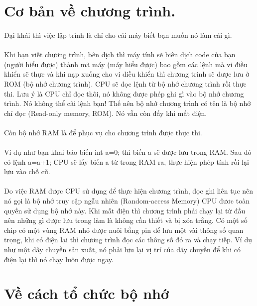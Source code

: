 \documentclass[12pt,a5paper]{book}
\begin{document}
	\section{Cơ bản về chương trình.}
	\paragraph{} 
Đại khái thì việc lập trình là chỉ cho cái máy biết bạn muốn nó làm cái gì.
	\paragraph{}
Khi bạn viết chương trình, bên dịch thì máy tính sẽ biên dịch code của bạn (người hiểu được) thành mã máy (máy hiểu được) bao gồm các lệnh mà vi điều khiển sẽ thực và khi nạp xuống cho vi điều khiển thì chương trình sẽ được lưu ở ROM (bộ nhớ chương trình). CPU sẽ đọc lệnh từ bộ nhớ chương trình rồi thực thi. Lưu ý là CPU chỉ đọc thôi, nó không được phép ghi gì vào bộ nhớ chương trình. Nó không thể cãi lệnh bạn! Thế nên bộ nhớ chương trình có tên là bộ nhớ chỉ đọc (Read-only memory, ROM). Nó vẫn còn đấy khi mất điện.
	\paragraph{}
Còn bộ nhớ RAM là để phục vụ cho chương trình được thực thi.
	\paragraph{}
Ví dụ như bạn khai báo biến int a=0; thì biến a sẽ được lưu trong RAM. Sau đó có lệnh a=a+1; CPU sẽ lấy biến a từ trong RAM ra, thực hiện phép tính rồi lại lưu vào chỗ cũ.
	\paragraph{}
Do việc RAM được CPU sử dụng để thực hiện chương trình, đọc ghi liên tục nên nó gọi là bộ nhớ truy cập ngẫu nhiên (Random-access Memory) CPU đươc toàn quyền sử dụng bộ nhớ này. Khi mất điện thì chương trình phải chạy lại từ đầu nên những gì được lưu trong làm là không cần thiết và bị xóa trắng. Có một số chip có một vùng RAM nhỏ được nuôi bằng pin để lưu một vài thông số quan trọng, khi có điện lại thì chương trình đọc các thông số đó ra và chạy tiếp. Ví dụ như một dây chuyền sản xuất, nó phải lưu lại vị trí của dây chuyền để khi có điện lại thì nó chạy luôn được ngay.

	\section{Về cách tổ chức bộ nhớ}
\end{document}
